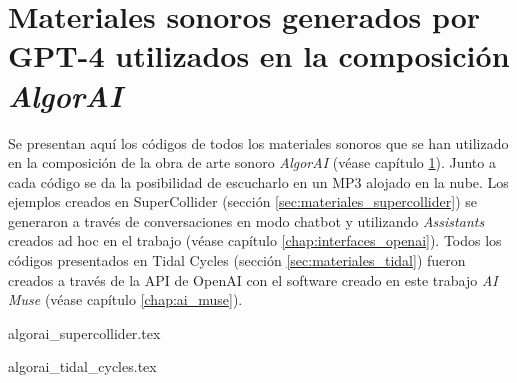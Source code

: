 \chapter{Materiales sonoros generados por GPT-4 utilizados en la composición \emph{AlgorAI}}
\label{anexo:algorai}

Se presentan aquí los códigos de todos los materiales sonoros que se han utilizado en la composición de la obra de arte sonoro \emph{AlgorAI} (véase capítulo \ref{anexo:algorai}). Junto a cada código se da la posibilidad de escucharlo en un MP3 alojado en la nube. Los ejemplos creados en SuperCollider (sección \ref{sec:materiales_supercollider}) se generaron a través de conversaciones en modo chatbot y utilizando \emph{Assistants} creados ad hoc en el trabajo (véase capítulo \ref{chap:interfaces_openai}). Todos los códigos presentados en Tidal Cycles (sección \ref{sec:materiales_tidal}) fueron creados a través de la API de OpenAI con el software creado en este trabajo \emph{AI Muse} (véase capítulo \ref{chap:ai_muse}).

{algorai_supercollider.tex}

{algorai_tidal_cycles.tex}

